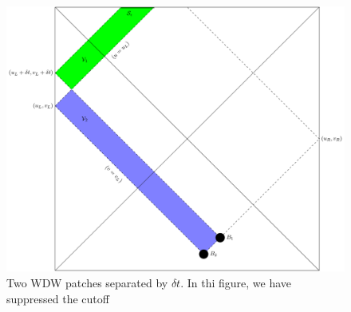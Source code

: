 \documentclass[8pt,aspectratio=169]{beamer}
\begin{document}
\begin{frame}
\begin{minipage}[t]{0.48\linewidth}
\begin{figure}
\begin{center}
        \includegraphics[scale=0.35]{2WDW.pdf}    
    
    \end{center}
    \caption{Two WDW patches separated by $\delta t$.  In thi figure, we have suppressed the cutoff}
    \label{fig:2WDW}
\end{figure}

\end{minipage}

\end{frame}


\end{document}
